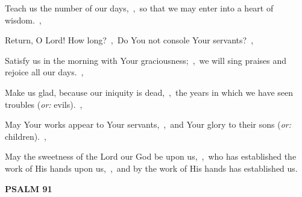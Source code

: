 \documentclass[12pt,twoside,a5paper]{article}
\newcommand{\psalm}[1]{\textbf{PSALM {#1}}\nopagebreak}
\newcommand{\translationoption}[1]{\emph{or:} #1}
\begin{document}
\begin{normalparskip}
  Teach us the number of our days,~\sep\ so that we may enter into a heart of wisdom.~\sep

  Return, O Lord! How long?~\sep\ Do You not console Your servants?~\sep

  Satisfy us in the morning with Your graciousness;~\sep\ we will sing praises and rejoice all our days.~\sep

  Make us glad, because our iniquity is dead,~\sep\ the years in which we have seen troubles (\translationoption{evils}).~\sep

  May Your works appear to Your servants,~\sep\ and Your glory to their sons (\translationoption{children}).~\sep

  May the sweetness of the Lord our God be upon us,~\sep\ who has established the work of His hands upon us,~\sep\ and by the work of His hands has established us.
\end{normalparskip}

\psalm{91}
\end{document}
